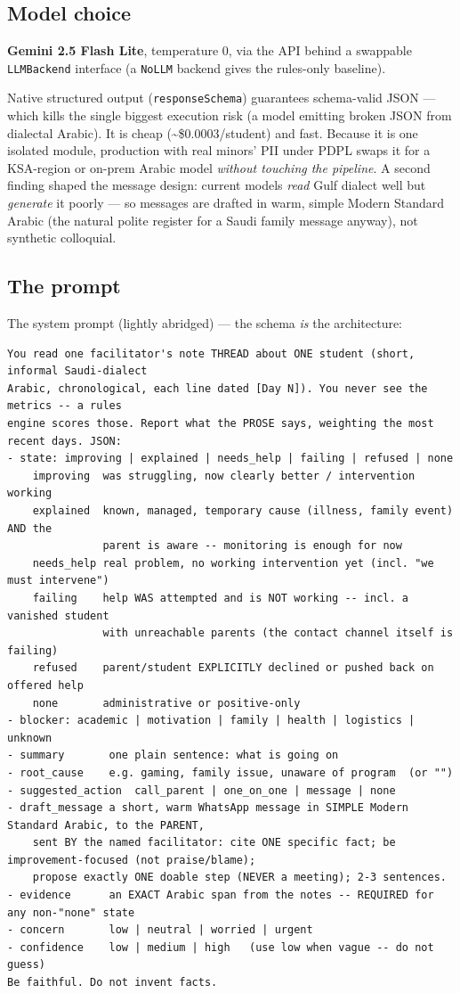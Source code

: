 \documentclass[11pt,paper=a4,parskip=half,DIV=11]{scrartcl}
\begin{document}
\subsection{Model choice}
\textbf{Gemini 2.5 Flash Lite}, temperature 0, via the API behind a swappable \texttt{LLMBackend}
interface (a \texttt{NoLLM} backend gives the rules-only baseline).
\begin{why}
Native structured output (\texttt{responseSchema}) guarantees schema-valid JSON --- which kills the
single biggest execution risk (a model emitting broken JSON from dialectal Arabic). It is cheap
(\textasciitilde\$0.0003/student) and fast. Because it is one isolated module, production with real
minors' PII under PDPL swaps it for a KSA-region or on-prem Arabic model \emph{without touching the
pipeline}. A second finding shaped the message design: current models \emph{read} Gulf dialect well but
\emph{generate} it poorly --- so messages are drafted in warm, simple Modern Standard Arabic (the natural
polite register for a Saudi family message anyway), not synthetic colloquial.
\end{why}

\subsection{The prompt}
The system prompt (lightly abridged) --- the schema \emph{is} the architecture:
\begin{lstlisting}
You read one facilitator's note THREAD about ONE student (short, informal Saudi-dialect
Arabic, chronological, each line dated [Day N]). You never see the metrics -- a rules
engine scores those. Report what the PROSE says, weighting the most recent days. JSON:
- state: improving | explained | needs_help | failing | refused | none
    improving  was struggling, now clearly better / intervention working
    explained  known, managed, temporary cause (illness, family event) AND the
               parent is aware -- monitoring is enough for now
    needs_help real problem, no working intervention yet (incl. "we must intervene")
    failing    help WAS attempted and is NOT working -- incl. a vanished student
               with unreachable parents (the contact channel itself is failing)
    refused    parent/student EXPLICITLY declined or pushed back on offered help
    none       administrative or positive-only
- blocker: academic | motivation | family | health | logistics | unknown
- summary       one plain sentence: what is going on
- root_cause    e.g. gaming, family issue, unaware of program  (or "")
- suggested_action  call_parent | one_on_one | message | none
- draft_message a short, warm WhatsApp message in SIMPLE Modern Standard Arabic, to the PARENT,
    sent BY the named facilitator: cite ONE specific fact; be improvement-focused (not praise/blame);
    propose exactly ONE doable step (NEVER a meeting); 2-3 sentences.
- evidence      an EXACT Arabic span from the notes -- REQUIRED for any non-"none" state
- concern       low | neutral | worried | urgent
- confidence    low | medium | high   (use low when vague -- do not guess)
Be faithful. Do not invent facts.
\end{lstlisting}
\end{document}
